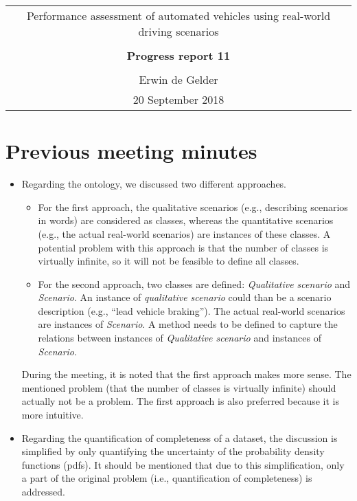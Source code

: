 \documentclass[10pt,final,a4paper,oneside,onecolumn]{article}
\newcommand{\progressreportnumber}{11}
\renewcommand{\author}{Erwin de Gelder}
\renewcommand{\date}{20 September 2018}
\renewcommand{\title}{Performance assessment of automated vehicles using real-world driving scenarios}
\begin{document}
	
\begin{center}
	\begin{tabular}{c}
		\title \\ \\
		\textbf{\huge Progress report \progressreportnumber} \\ \\
		\author \\ 
		\date
	\end{tabular}
\end{center}

\section{Previous meeting minutes}

\begin{itemize}
	\item Regarding the ontology, we discussed two different approaches. 
	\begin{itemize}
		\item For the first approach, the qualitative scenarios (e.g., describing scenarios in words) are considered as classes, whereas the quantitative scenarios (e.g., the actual real-world scenarios) are instances of these classes. A potential problem with this approach is that the number of classes is virtually infinite, so it will not be feasible to define all classes.
		\item For the second approach, two classes are defined: \emph{Qualitative scenario} and \emph{Scenario}. An instance of \emph{qualitative scenario} could than be a scenario description (e.g., ``lead vehicle braking''). The actual real-world scenarios are instances of \emph{Scenario}. A method needs to be defined to capture the relations between instances of \emph{Qualitative scenario} and instances of \emph{Scenario}. 
	\end{itemize}
	During the meeting, it is noted that the first approach makes more sense. The mentioned problem (that the number of classes is virtually infinite) should actually not be a problem. The first approach is also preferred because it is more intuitive.
	
	\item Regarding the quantification of completeness of a dataset, the discussion is simplified by only quantifying the uncertainty of the probability density functions (pdfs). It should be mentioned that due to this simplification, only a part of the original problem (i.e., quantification of completeness) is addressed.
	

\end{itemize}
\end{document}
